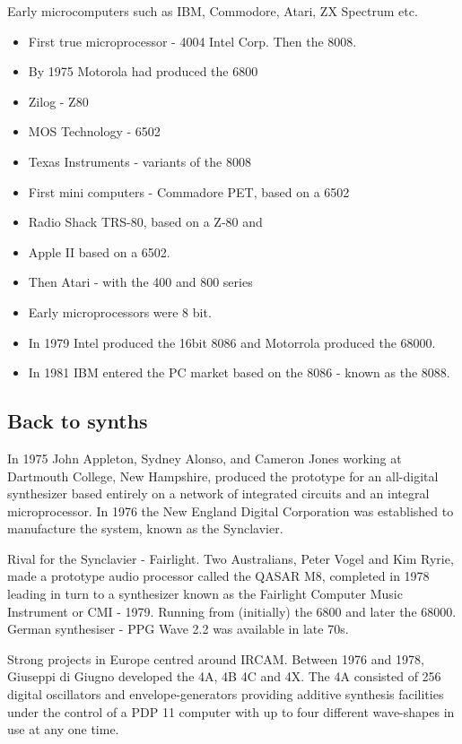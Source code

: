 Early microcomputers such as IBM, Commodore, Atari, ZX Spectrum etc.

\begin{itemize}
\item First true microprocessor - 4004 Intel Corp.  Then the 8008.
\item By 1975 Motorola had produced the 6800
\item Zilog - Z80
\item MOS Technology - 6502
\item Texas Instruments - variants of the 8008
\item First mini computers - Commadore PET, based on a 6502
\item Radio Shack TRS-80, based on a Z-80 and
\item Apple II based on a 6502.
\item Then Atari - with the 400 and 800 series
\item Early microprocessors were 8 bit.
\item In 1979 Intel produced the 16bit 8086 and Motorrola produced the 68000.
\item In 1981 IBM entered the PC market based on the 8086 - known as the 8088.
\end{itemize}

\subsection{Back to synths}

In 1975 John Appleton, Sydney Alonso, and Cameron Jones working at Dartmouth College, New Hampshire, produced the prototype for an all-digital synthesizer based entirely on a network of integrated circuits and an integral microprocessor.  In 1976 the New England Digital Corporation was established to manufacture the system, known as the Synclavier.


Rival for the Synclavier - Fairlight.
Two Australians, Peter Vogel and Kim Ryrie, made a prototype audio processor called the QASAR M8, completed in 1978 leading in turn to a synthesizer known as the Fairlight Computer Music Instrument or CMI - 1979.  Running from (initially) the 6800 and later the 68000.
German synthesiser - PPG Wave 2.2 was available in late 70s.

Strong projects in Europe centred around IRCAM.
Between 1976 and 1978, Giuseppi di Giugno developed the 4A, 4B 4C and 4X. The 4A consisted of 256 digital oscillators and envelope-generators providing additive synthesis facilities under the control of a PDP 11 computer with up to four different wave-shapes in use at any one time. 

